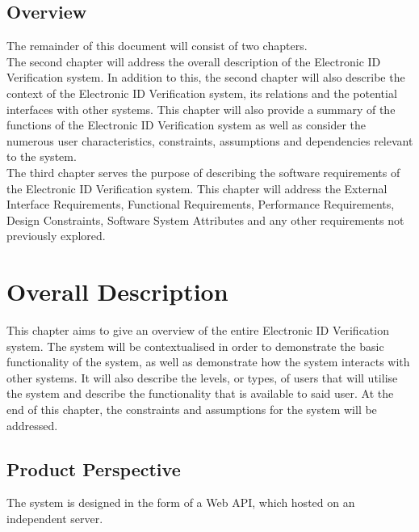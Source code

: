 \documentclass{article}
\def \project{Electronic ID Verification }
\begin{document}
		\subsection{Overview}\label{subsec:overview}
			The remainder of this document will consist of two chapters.\\

            \noindent The second chapter will address the overall description of the \project system. In addition to this, the second chapter will also describe the context of the \project system, its relations and the potential interfaces with other systems. This chapter will also provide a summary of the functions of the \project system as well as consider the numerous user characteristics, constraints, assumptions and dependencies relevant to the system.\\
            
            \noindent The third chapter serves the purpose of describing the software requirements of the \project system. This chapter will address the External Interface Requirements, Functional Requirements, Performance Requirements, Design Constraints, Software System Attributes and any other requirements not previously explored.\\

	\cleardoublepage

	\section{Overall Description}\label{sec:overall-description}
		This chapter aims to give an overview of the entire \project system. The system will be contextualised in order to demonstrate the basic functionality of the system, as well as demonstrate how the system interacts with other systems. It will also describe the levels, or types, of users that will utilise the system and describe the functionality that is available to said user. At the end of this chapter, the constraints and assumptions for the system will be addressed.

		\subsection{Product Perspective}\label{subsec:overall-product-perspective}
		The system is designed in the form of a Web API, which hosted on an independent server.\\
		
\end{document}
